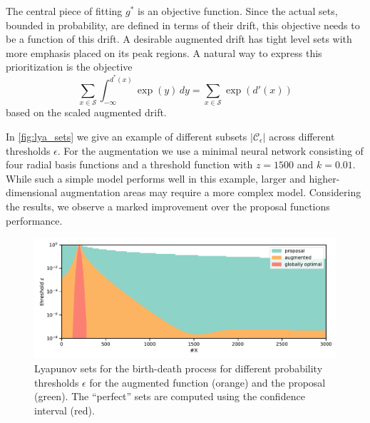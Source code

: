 The central piece of fitting $g^*$ is an objective function.
Since the actual sets, bounded in probability, are defined in terms
of their drift, this objective needs to be a function of this drift.
A desirable augmented drift has tight level sets with more emphasis
placed on its peak regions.
A natural way to express this prioritization is the objective
\[\sum_{x\in\mathcal{S}}\int_{-\infty}^{d^*(x)}\exp(y)\,dy =
\sum_{x\in\mathcal{S}} \exp(d'(x)) \]
based on the scaled augmented drift.

In \autoref{fig:lya_sets} we give an example of different subsets
$\left|\mathcal{C}_{\epsilon}\right|$ across different thresholds $\epsilon$.
For the augmentation we use a minimal neural network consisting of
four radial basis functions and a threshold function with $z=1500$ and $k=0.01$.
While such a simple model performs well in this example, larger and
higher-dimensional augmentation areas may require a more complex model.
Considering the results, we observe a marked improvement over the
proposal functions performance.
\begin{figure}[htb]
  \centering
  \includegraphics[width=\textwidth]{gfx/lya_sets.pdf}
  \caption[Augmented v.\ proposal Lyapunov
  sets]{\label{fig:lya_sets}Lyapunov sets for the birth-death process
    for different probability thresholds $\epsilon$ for the augmented
    function (orange) and the proposal (green). The ``perfect'' sets
  are computed using the confidence interval (red).}
\end{figure}

